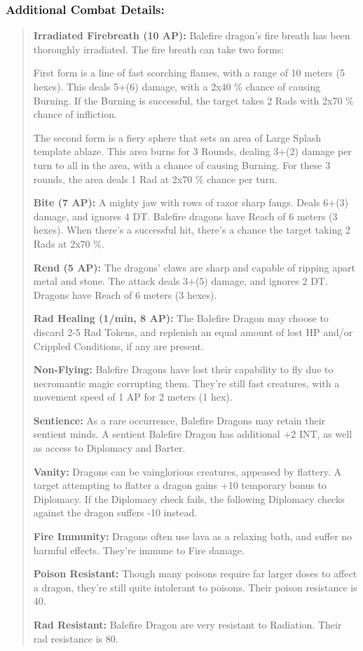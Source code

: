 \documentclass[11pt,a4paper,twocolumn]{book}
\begin{document}
	\subsubsection*{Additional Combat Details:}
	\begin{verse}
		\textbf{Irradiated Firebreath (10 AP):} Balefire dragon's fire breath has been thoroughly irradiated. The fire breath can take two forms: 
		
		First form is a line of fast scorching flames, with a range of 10 meters (5 hexes). This deals 5+(6) damage, with a 2x40 \% chance of causing Burning. If the Burning is successful, the target takes 2 Rads with 2x70 \% chance of infliction.
		
		The second form is a fiery sphere that sets an area of Large Splash template ablaze. This area burns for 3 Rounds, dealing 3+(2) damage per turn to all in the area, with a chance of causing Burning. For these 3 rounds, the area deals 1 Rad at 2x70 \% chance per turn.
		
		\textbf{Bite (7 AP):} A mighty jaw with rows of razor sharp fangs. Deals 6+(3) damage, and ignores 4 DT. Balefire dragons have Reach of 6 meters (3 hexes). When there's a successful hit, there's a chance the target taking 2 Rads at 2x70 \%.
		
		\textbf{Rend (5 AP):} The dragons' claws are sharp and capable of ripping apart metal and stone. The attack deals 3+(5) damage, and ignores 2 DT. Dragons have Reach of 6 meters (3 hexes).

		\textbf{Rad Healing (1/min, 8 AP):} The Balefire Dragon may choose to discard 2-5 Rad Tokens, and replenish an equal amount of lost HP and/or Crippled Conditions, if any are present.
		
		\textbf{Non-Flying:} Balefire Dragons have lost their capability to fly due to necromantic magic corrupting them. They're still fast creatures, with a movement speed of 1 AP for 2 meters (1 hex).

		\textbf{\dag Sentience:} As a rare occurrence, Balefire Dragons may retain their sentient minds. A sentient Balefire Dragon has additional +2 INT, as well as access to Diplomacy and Barter. 
		
		\textbf{\dag Vanity:} Dragons can be vainglorious creatures, appeased by flattery. A target attempting to flatter a dragon gains +10 temporary bonus to Diplomacy. If the Diplomacy check fails, the following Diplomacy checks against the dragon suffers -10 instead.
		
		\textbf{Fire Immunity:} Dragons often use lava as a relaxing bath, and suffer no harmful effects. They're immune to Fire damage.
		
		\textbf{Poison Resistant:} Though many poisons require far larger doses to affect a dragon, they're still quite intolerant to poisons. Their poison resistance is 40.
		
		\textbf{Rad Resistant:} Balefire Dragon are very resistant to Radiation. Their rad resistance is 80.
	\end{verse}
	
\end{document}
